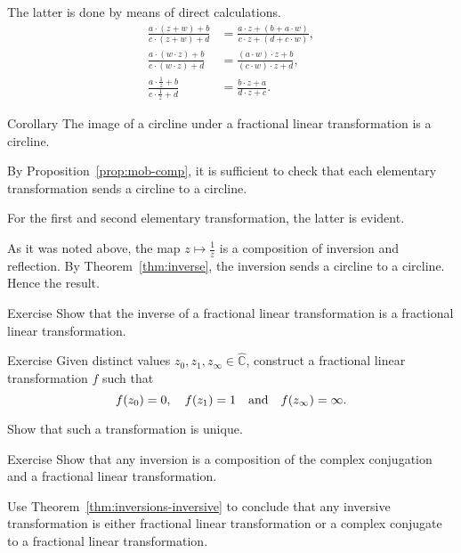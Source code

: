 The latter is done by means of direct calculations.
\begin{align*}
\frac{a\cdot (z+w) + b}{c\cdot (z+w) + d}
&=
\frac{a\cdot z + (b+a\cdot w)}{c\cdot z + (d+c\cdot w)},
\\
\frac{a\cdot (w\cdot z) + b}{c\cdot (w\cdot z) + d}
&=
\frac{(a\cdot w)\cdot z + b}{(c\cdot w)\cdot z + d},
\\
\frac{a\cdot \frac1z + b}{c\cdot \frac1z + d}
&=
\frac{b\cdot z + a}{d\cdot z + c}.
\end{align*}
\qedsf


\begin{thm}{Corollary}\label{cor:cline-Moeb}
The image of a circline under a fractional linear transformation 
is a circline.
\end{thm}

By Proposition~\ref{prop:mob-comp},
it is sufficient to check that each elementary transformation sends a circline to a circline.

For the first and second elementary transformation, the latter is evident.

As it was noted above,
the map $z\mapsto\tfrac1z$ is a composition of inversion and reflection.
By Theorem~\ref{thm:inverse}, the inversion sends a circline to a circline.
Hence the result.
\qeds

\begin{thm}{Exercise}\label{ex:inverse-Mob}
Show that the inverse of a fractional linear transformation is a fractional linear transformation.
\end{thm}


\begin{thm}{Exercise}\label{ex:3-point-Mob}
Given distinct values $z_0,z_1,z_\infty\in \hat{\mathbb{C}}$,
construct a fractional linear transformation $f$ such that 
\[f(z_0)=0,
\quad 
f(z_1)=1
\quad\text{and}\quad 
f(z_\infty)\z=\infty.\]

Show that such a transformation is unique.
\end{thm}

\begin{thm}{Exercise}\label{ex:inversion-Mob}
Show that any inversion is a composition of the complex conjugation and a fractional linear transformation.

Use Theorem~\ref{thm:inversions-inversive} to conclude that any inversive transformation is either fractional linear transformation or a complex conjugate to a fractional linear transformation.
\end{thm}



